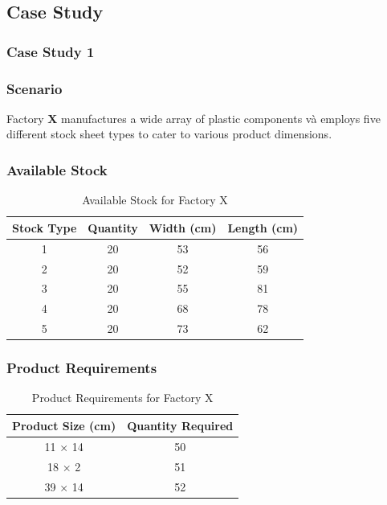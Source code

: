 \documentclass[a4paper]{article}
\begin{document}
\subsection{Case Study}

\subsubsection{Case Study 1}

\subsubsection*{Scenario}
Factory \textbf{X} manufactures a wide array of plastic components và employs five different stock sheet types to cater to various product dimensions.

\subsubsection*{Available Stock}
\begin{table}[H]
    \centering
    \caption{Available Stock for Factory X}
    \begin{tabular}{|c|c|c|c|}
        \hline
        \textbf{Stock Type} & \textbf{Quantity} & \textbf{Width (cm)} & \textbf{Length (cm)} \\ \hline
        1 & 20 & 53 & 56  \\ \hline
        2 & 20 & 52 & 59  \\ \hline
        3 & 20 & 55 & 81  \\ \hline
        4 & 20 & 68 & 78  \\ \hline
        5 & 20 & 73 & 62  \\ \hline
    \end{tabular}
\end{table}

\subsubsection*{Product Requirements}
\begin{table}[H]
    \centering
    \caption{Product Requirements for Factory X}
    \begin{tabular}{|c|c|}
        \hline
        \textbf{Product Size (cm)} & \textbf{Quantity Required} \\ \hline
        11 × 14 & 50 \\ \hline
        18 × 2 & 51 \\ \hline
        39 × 14 & 52 \\ \hline
    \end{tabular}
\end{table}
\end{document}
